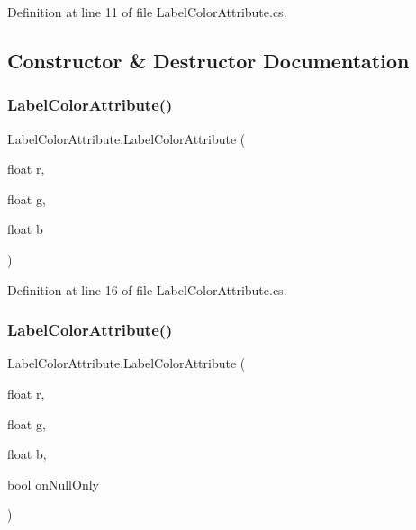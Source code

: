 Definition at line 11 of file Label\+Color\+Attribute.\+cs.



\subsection{Constructor \& Destructor Documentation}
\mbox{\label{class_label_color_attribute_a02177b63cf4ff0149ca1c16de26ae719}} 
\subsubsection{\texorpdfstring{Label\+Color\+Attribute()}{LabelColorAttribute()}\hspace{0.1cm}{\footnotesize\ttfamily [1/2]}}
{\footnotesize\ttfamily Label\+Color\+Attribute.\+Label\+Color\+Attribute (\begin{DoxyParamCaption}\item[{float}]{r,  }\item[{float}]{g,  }\item[{float}]{b }\end{DoxyParamCaption})}



Definition at line 16 of file Label\+Color\+Attribute.\+cs.

\mbox{\label{class_label_color_attribute_aeb74525f7fe296360ab5dfa1e8ee718c}} 
\subsubsection{\texorpdfstring{Label\+Color\+Attribute()}{LabelColorAttribute()}\hspace{0.1cm}{\footnotesize\ttfamily [2/2]}}
{\footnotesize\ttfamily Label\+Color\+Attribute.\+Label\+Color\+Attribute (\begin{DoxyParamCaption}\item[{float}]{r,  }\item[{float}]{g,  }\item[{float}]{b,  }\item[{bool}]{on\+Null\+Only }\end{DoxyParamCaption})}



